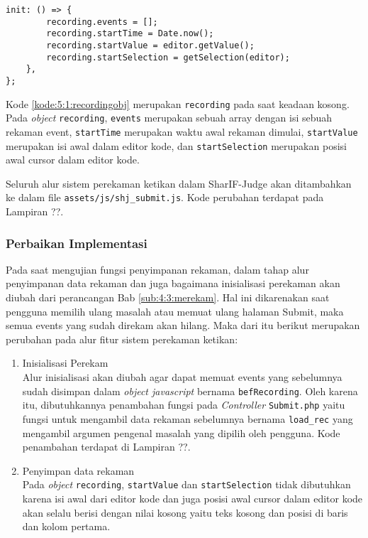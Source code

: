 \begin{enumerate}
\begin{lstlisting}[caption={Contoh argumen yang diberikan oleh fungsi onchange}, label={kode:5:1:recordingobj}]
    init: () => {
        recording.events = [];
        recording.startTime = Date.now();
        recording.startValue = editor.getValue();
        recording.startSelection = getSelection(editor);
    },
};
    \end{lstlisting}

    Kode \ref{kode:5:1:recordingobj} merupakan \verb|recording| pada saat keadaan kosong. Pada \textit{object} \verb|recording|, \verb|events| merupakan sebuah array dengan isi sebuah rekaman event, \verb|startTime| merupakan waktu awal rekaman dimulai, \verb|startValue| merupakan isi awal dalam editor kode, dan \verb|startSelection| merupakan posisi awal cursor dalam editor kode.
\end{enumerate}

Seluruh alur sistem perekaman ketikan dalam SharIF-Judge akan ditambahkan ke dalam file \verb|assets/js/|\verb|shj_submit.js|. Kode perubahan terdapat pada Lampiran ??.

\subsubsection{Perbaikan Implementasi}

Pada saat mengujian fungsi penyimpanan rekaman, dalam tahap alur penyimpanan data rekaman dan juga bagaimana inisialisasi perekaman akan diubah dari perancangan Bab \ref{sub:4:3:merekam}. Hal ini dikarenakan saat pengguna memilih ulang masalah atau memuat ulang halaman Submit, maka semua events yang sudah direkam akan hilang. Maka dari itu berikut merupakan perubahan pada alur fitur sistem perekaman ketikan:

\begin{enumerate}
    \item Inisialisasi Perekam \\
    Alur inisialisasi akan diubah agar dapat memuat events yang sebelumnya sudah disimpan dalam \textit{object javascript} bernama \verb|befRecording|. Oleh karena itu, dibutuhkannya penambahan fungsi pada \textit{Controller} \verb|Submit.php| yaitu fungsi untuk mengambil data rekaman sebelumnya bernama \verb|load_rec| yang mengambil argumen pengenal masalah yang dipilih oleh pengguna. Kode penambahan terdapat di Lampiran ??.
    \item Penyimpan data rekaman \\
    Pada \textit{object} \verb|recording|, \verb|startValue| dan \verb|startSelection| tidak dibutuhkan karena isi awal dari editor kode dan juga posisi awal cursor dalam editor kode akan selalu berisi dengan nilai kosong yaitu teks kosong dan posisi di baris dan kolom pertama.
\end{enumerate}

